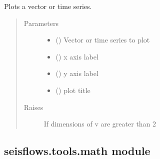 \documentclass[letterpaper,10pt,english]{sphinxmanual}
\begin{document}

\begin{fulllineitems}
\label{\detokenize{ref/seisflows.tools:seisflows.tools.graphics.plot_vector}}
Plots a vector or time series.
\begin{quote}\begin{description}
\item[{Parameters}] \leavevmode\begin{itemize}
\item {} 
 (\sphinxstyleliteralemphasis{\sphinxupquote{, }}) \textendash{} Vector or time series to plot

\item {} 
 () \textendash{} x axis label

\item {} 
 () \textendash{} y axis label

\item {} 
 () \textendash{} plot title

\end{itemize}

\item[{Raises}] \leavevmode
{} \textendash{} If dimensions of v are greater than 2

\end{description}\end{quote}

\end{fulllineitems}



\subsection{seisflows.tools.math module}
\label{\detokenize{ref/seisflows.tools:module-seisflows.tools.math}}\label{\detokenize{ref/seisflows.tools:seisflows-tools-math-module}}
\end{document}
